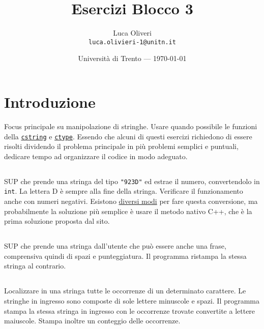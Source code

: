 \documentclass{article}
\title{Esercizi Blocco 3} %
\author{Luca Oliveri\\ \texttt{luca.olivieri-1@unitn.it}} %
\date{Università di Trento --- \today} %
\begin{document}
\maketitle %

\section*{Introduzione} %

\setcounter{section}{3}
Focus principale su manipolazione di stringhe. Usare quando possibile le funzioni della \href{http://www.cplusplus.com/reference/cstring/}{\texttt{cstring}} e \href{http://www.cplusplus.com/reference/cctype/}{\texttt{ctype}}. Essendo che alcuni di questi esercizi richiedono di essere risolti dividendo il problema principale in più problemi semplici e puntuali, dedicare tempo ad organizzare il codice in modo adeguato.


\subsection{}
SUP che prende una stringa del tipo \texttt{"923D"} ed estrae il numero, convertendolo in \texttt{int}. La lettera D è sempre alla fine della stringa. Verificare il funzionamento anche con numeri negativi. Esistono \href{https://www.geeksforgeeks.org/converting-strings-numbers-cc/}{diversi modi} per fare questa conversione, ma probabilmente la soluzione più semplice è usare il metodo nativo C++, che è la prima soluzione proposta dal sito.

\subsection{}
SUP che prende una stringa dall'utente che può essere anche una frase, comprensiva quindi di spazi e punteggiatura. Il programma ristampa la stessa stringa al contrario.  

\subsection{}
Localizzare in una stringa tutte le occorrenze di un determinato carattere. Le stringhe in ingresso sono composte di sole lettere minuscole e spazi. Il programma stampa la stessa stringa in ingresso con le occorrenze trovate convertite a lettere maiuscole. Stampa inoltre un conteggio delle occorrenze.
\end{document}

